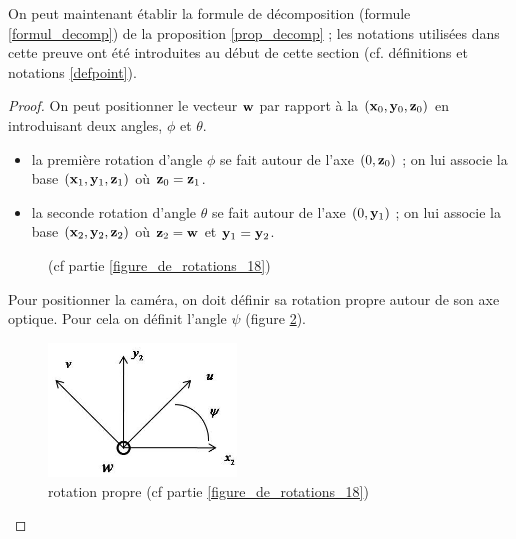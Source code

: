 On peut maintenant établir la formule de décomposition (formule \ref{formul_decomp}) de la proposition \ref{prop_decomp} ; les notations utilisées dans cette preuve ont été introduites au début de cette section (cf. définitions et notations \ref{defpoint}).

\begin{proof}
On peut positionner le vecteur $\mathbf{w}$ par rapport à la $(\mathbf{x}_{0},\mathbf{y}_{0},\mathbf{z}_{0}) $ en introduisant deux angles, $\phi$ et $\theta$.

\begin{itemize}
\item la première rotation d'angle $\phi$ se fait autour de l'axe $(0,\mathbf{z}_{0})$ ; on lui associe la base $(\mathbf{x}_{1},\mathbf{y}_{1},\mathbf{z}_{1}) $ où $\mathbf{z}_{0}=\mathbf{z}_{1}$.
\item la seconde rotation d'angle $\theta$ se fait autour de l'axe $(0,\mathbf{y}_1)$ ; on lui associe la base $(\mathbf{x}_{2},\mathbf{y}_{2},\mathbf{z}_{2}) $ où $\mathbf{z}_{2}=\mathbf{w}$ et $\mathbf{y}_{1}=\mathbf{y}_{2}$.
\end{itemize}

\begin{figure}[h!]
\centering
{}
\caption{(cf partie \ref{figure_de_rotations_18})}
\label{img_angles}
\end{figure}

Pour positionner la caméra, on doit définir sa rotation propre autour de son axe optique. Pour cela on définit l'angle $\psi$ (figure \ref{decompgeo_rotationPropre}).
\begin{figure}[h!]
\centering
\includegraphics[width=5cm]{graphe3.jpg}
\caption{rotation propre (cf partie \ref{figure_de_rotations_18})}
\label{decompgeo_rotationPropre}
\end{figure}


\end{proof}
